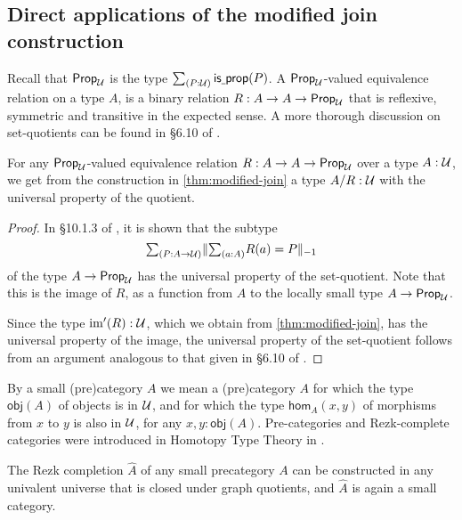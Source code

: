 \subsection{Direct applications of the modified join construction}

Recall that $\mathsf{Prop}_{\mathcal{U}}$ is the type $\sm{P:\UU}\isprop(P)$. A $\mathsf{Prop}_{\mathcal{U}}$-valued
equivalence relation on a type $A$, is a binary relation $R:A\to A\to\mathsf{Prop}_{\mathcal{U}}$
that is reflexive, symmetric and transitive in the expected sense.
A more thorough discussion on set-quotients can be found in \S 6.10 of
\cite{hottbook}.

\begin{cor}\label{cor:setquotients}
For any $\mathsf{Prop}_{\mathcal{U}}$-valued equivalence relation $R:A\to A\to\mathsf{Prop}_{\mathcal{U}}$ over a type
$A:\mathcal{U}$, we get from the construction in \autoref{thm:modified-join} a type $A/R:\mathcal{U}$
with the universal property of the quotient.
\end{cor}

\begin{proof}
In \S 10.1.3 of \cite{hottbook}, it is shown that the subtype 
\begin{equation*}
\sm{P:A\to\UU} \trunc{-1}{\sm{a:A} R(a)=P}
\end{equation*} 
of the type $A\to\mathsf{Prop}_{\mathcal{U}}$ has the universal property of the set-quotient.
Note that this is the image of $R$, as a function from $A$ to the locally small
type $A\to\mathsf{Prop}_{\mathcal{U}}$. 

Since the type $\operatorname{im}'(R):\mathcal{U}$, which we obtain from \autoref{thm:modified-join},
has the universal property of the image, the universal property of the
set-quotient follows from an argument analogous to that given in \S 6.10 of \cite{hottbook}.
\end{proof}

By a small (pre)category $A$ we mean a (pre)category $A$ for which the type
$\mathsf{obj}(A)$ of objects is in $\mathcal{U}$, and for which the type
$\mathsf{hom}_A(x,y)$ of morphisms from $x$ to $y$ is also in $\mathcal{U}$, for any
$x,y:\mathsf{obj}(A)$. Pre-categories and Rezk-complete categories were introduced
in Homotopy Type Theory in \cite{AKS}.

\begin{cor}\label{cor:rezkcompletion}
The Rezk completion $\hat{A}$ of any small precategory $A$ can be constructed in any 
univalent universe that is closed under graph quotients,
and $\hat{A}$ is again a small category. 
\end{cor}

